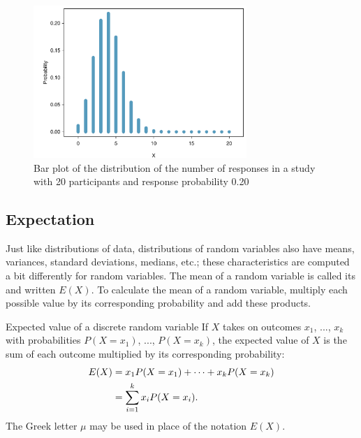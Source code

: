 \begin{figure}[h]
	\centering
	\includegraphics[width=0.72\textwidth]
	{ch_distributions_oi_biostat/figures/distRespClinStudy/distRespClinStudy.pdf}
	\caption{Bar plot of the distribution of the number of responses in a study with 20 participants and response probability 0.20}
	\label{distRespClinStudy}
\end{figure}

\subsection{Expectation} 
\label{section:expectationRandomVariable}


Just like distributions of data, distributions of random variables also have means, variances, standard deviations, medians, etc.; these characteristics are computed a bit differently for random variables. The mean of a random variable is called its  and written $E(X)$. To calculate the mean of a random variable, multiply each possible value by its corresponding probability and add these products.

\begin{onebox}{Expected value of a discrete random variable}
If $X$ takes on outcomes $x_1$, ..., $x_k$ with probabilities $P(X=x_1)$, ..., $P(X=x_k)$, the expected value of $X$ is the sum of each outcome multiplied by its corresponding probability:
\begin{align}
E(X) 	&= x_1 P(X=x_1) + \cdots + x_k P(X=x_k) \notag \\
&= \sum_{i=1}^{k}x_iP(X=x_i).
\end{align}
The Greek letter $\mu$ may be used in place of the notation $E(X)$.
\end{onebox}

